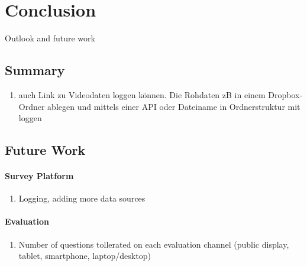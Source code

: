 \section{Conclusion}

Outlook and future work



\subsection{Summary}

\begin{enumerate}
\item auch Link zu Videodaten loggen können. Die Rohdaten zB in einem Dropbox-Ordner ablegen und mittels einer API oder Dateiname in Ordnerstruktur mit loggen
\end{enumerate}


\subsection{Future Work}


\paragraph{Survey Platform}

	\begin{enumerate}
	\item Logging, adding more data sources
	\end{enumerate}


\paragraph{Evaluation}

	\begin{enumerate}
	\item Number of questions tollerated on each evaluation channel (public display, tablet, smartphone, laptop/desktop)
	\end{enumerate}

